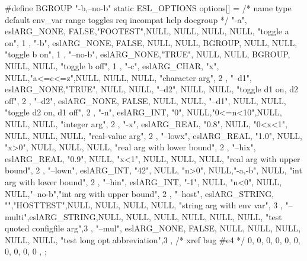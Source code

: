 \begin{cchunk}
#define BGROUP "-b,--no-b"
static ESL_OPTIONS options[] = {
  /* name    type        default env_var  range toggles req  incompat help                  docgroup */
 { "-a",     eslARG_NONE, FALSE,"FOOTEST",NULL,  NULL,  NULL,  NULL,  "toggle a on",               1 },
 { "-b",     eslARG_NONE, FALSE,  NULL,   NULL, BGROUP, NULL,  NULL,  "toggle b on",               1 },
 { "--no-b", eslARG_NONE,"TRUE",  NULL,   NULL, BGROUP, NULL,  NULL,  "toggle b off",              1 },
 { "-c",     eslARG_CHAR,   "x",  NULL,"a<=c<=z",NULL,  NULL,  NULL,  "character arg",             2 },
 { "--d1",   eslARG_NONE,"TRUE",  NULL,   NULL, "--d2", NULL,  NULL,  "toggle d1 on, d2 off",      2 },
 { "--d2",   eslARG_NONE, FALSE,  NULL,   NULL, "--d1", NULL,  NULL,  "toggle d2 on, d1 off",      2 },
 { "-n",     eslARG_INT,    "0",  NULL,"0<=n<10",NULL,  NULL,  NULL,  "integer arg",               2 },
 { "-x",     eslARG_REAL, "0.8",  NULL, "0<x<1", NULL,  NULL,  NULL,  "real-value arg",            2 },
 { "--lowx", eslARG_REAL, "1.0",  NULL,   "x>0", NULL,  NULL,  NULL,  "real arg with lower bound", 2 },
 { "--hix",  eslARG_REAL, "0.9",  NULL,   "x<1", NULL,  NULL,  NULL,  "real arg with upper bound", 2 },
 { "--lown", eslARG_INT,   "42",  NULL,   "n>0", NULL,"-a,-b", NULL,  "int arg with lower bound",  2 },
 { "--hin",  eslARG_INT,   "-1",  NULL,   "n<0", NULL,  NULL,"--no-b","int arg with upper bound",  2 },
 { "--host", eslARG_STRING, "","HOSTTEST",NULL,  NULL,  NULL,  NULL,  "string arg with env var",   3 },
 { "--multi",eslARG_STRING,NULL,  NULL,   NULL,  NULL,  NULL,  NULL,  "test quoted configfile arg",3 },
 { "--mul",  eslARG_NONE, FALSE,  NULL,   NULL,  NULL,  NULL,  NULL,  "test long opt abbreviation",3 }, /* xref bug #e4 */
 {  0, 0, 0, 0, 0, 0, 0, 0, 0, 0 },
};
\end{cchunk}
